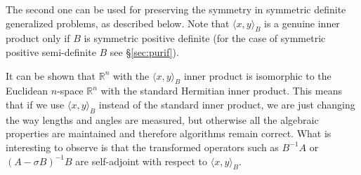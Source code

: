 	The second one can be used for preserving the symmetry in symmetric definite generalized problems, as described below. Note that $\langle x,y\rangle_B$ is a genuine inner product only if $B$ is symmetric positive definite (for the case of symmetric positive semi-definite $B$ see \S\ref{sec:purif}).

	It can be shown that $\mathbb{R}^n$ with the $\langle x,y\rangle_B$ inner product is isomorphic to the Euclidean $n$-space $\mathbb{R}^n$ with the standard Hermitian inner product. This means that if we use $\langle x,y\rangle_B$ instead of the standard inner product, we are just changing the way lengths and angles are measured, but otherwise all the algebraic properties are maintained and therefore algorithms remain correct. What is interesting to observe is that the transformed operators such as $B^{-1}\!A$ or $(A-\sigma B)^{-1}B$ are self-adjoint with respect to $\langle x,y\rangle_B$.

